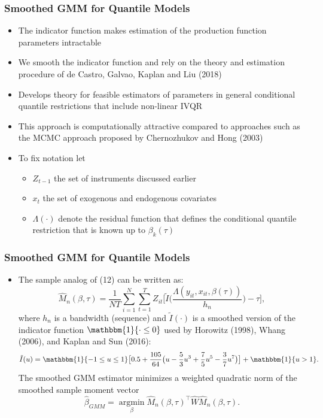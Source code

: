 \documentclass{beamer}
\begin{document}
\begin{frame}
\frametitle{Smoothed GMM for Quantile Models}
\begin{itemize}
	\item The indicator function makes estimation of the production function parameters intractable
	\item We smooth the indicator function and rely on the theory and estimation procedure of de Castro, Galvao, Kaplan and Liu (2018)
	\item Develops theory for feasible estimators of parameters in general conditional quantile restrictions that include non-linear IVQR
	\item This approach is computationally attractive compared to approaches such as the MCMC approach proposed by Chernozhukov and Hong (2003)
	\item To fix notation let
	\begin{itemize}
		\item $Z_{t-1}$ the set of instruments discussed earlier
		\item $x_{t}$ the set of exogenous and endogenous covariates
		\item $\Lambda(\cdot)$ denote the residual function that defines the conditional quantile restriction that is known up to $\beta_{k}(\tau)$
	\end{itemize}
	
\end{itemize}
\end{frame}

\begin{frame}
\frametitle{Smoothed GMM for Quantile Models}
\begin{itemize}
	\item The sample analog of (12) can be written as:
	\begin{equation}
    \hat{M}_{n}(\beta, \tau)=\frac{1}{NT}\sum_{i=1}^{N}\sum_{t=1}^{T}Z_{it}\Bigg[\tilde{I}\Bigg(\frac{\Lambda(y_{it}, x_{it}, \beta(\tau))}{h_{n}}\Bigg)-\tau\Bigg],
	\end{equation}
	where $h_{n}$ is a bandwidth (sequence) and $\tilde{I}(\cdot)$ is a smoothed version of the indicator function $\mathbbm{1}\{\cdot \leq 0\}$ used by Horowitz (1998), Whang (2006), and Kaplan and Sun (2016):
	\begin{equation}
	    \tilde{I}(u)=\mathbbm{1}\{-1\leq u \leq 1\}\big[0.5+\frac{105}{64}\big(u-\frac{5}{3}u^{3}+\frac{7}{5}u^{5}- \frac{3}{7}u^{7}\big)\big]+\mathbbm{1}\{u>1\}.
	\end{equation}
	The smoothed GMM estimator minimizes a weighted quadratic norm of the smoothed sample moment vector
	\begin{equation}
		\hat{\beta}_{GMM}=\underset{\beta}{\operatorname{argmin}}\hat{M}_{n}(\beta, \tau)^{\top}\hat{W}\hat{M}_{n}(\beta, \tau).
		\end{equation}
\end{itemize}
\end{frame}
\end{document}
